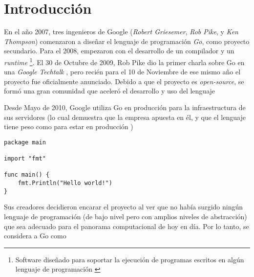 







\clearpage
\tableofcontents
\clearpage 

\lstset{style=go}

\section{Introducción}

En el año 2007, tres ingenieros de Google (\emph{Robert Griesemer}, \emph{Rob Pike}, y \emph{Ken Thompson}) comenzaron a diseñar el lenguaje de programación \emph{Go}, como proyecto secundario. Para el 2008, empezaron con el desarrollo de un compilador y un \emph{runtime} \footnote{Software diseñado para soportar la ejecución de programas escritos en algún lenguaje de programación \autocite{Wikipedia:runtime}}. El 30 de Octubre de 2009, Rob Pike dio la primer charla sobre Go en una \emph{Google Techtalk} \autocite{TheGoProgrammingLanguage}, pero recién para el 10 de Noviembre de ese mismo año el proyecto fue oficialmente anunciado. Debido a que el proyecto es \emph{open-source}, se formó una gran comunidad que aceleró el desarrollo y uso del lenguaje 

Desde Mayo de 2010, Google utiliza Go en producción para la infraestructura de sus servidores (lo cual demuestra que la empresa apuesta en él, y que el lenguaje tiene peso como para estar en producción \autocite{TheWayToGo:Origins})

\vspace*{10mm}
\begin{lstlisting}[title=\dq{Hola mundo} en Go]
package main

import "fmt"

func main() {
    fmt.Println("Hello world!")
}
\end{lstlisting}


Sus creadores decidieron encarar el proyecto al ver que no había surgido ningún lenguaje de programación (de bajo nivel pero con amplios niveles de abstracción) que sea adecuado para el panorama computacional de hoy en día. Por lo tanto, se considera a Go como  \autocite{BookTheGoProgrammingLanguage:Preface} 

